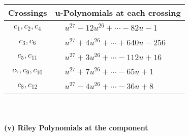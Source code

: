 \documentclass[1p]{elsarticle_modified}
\theoremstyle{definition}
\begin{document}
\begin{tabular}{m{50pt}|m{274pt}}
Crossings & \hspace{64pt}u-Polynomials at each crossing \\
\hline $$\begin{aligned}c_{1},c_{2},c_{4}\end{aligned}$$&$\begin{aligned}
&u^{27}-12 u^{26}+\cdots-82 u-1
\end{aligned}$\\
\hline $$\begin{aligned}c_{3},c_{6}\end{aligned}$$&$\begin{aligned}
&u^{27}+4 u^{26}+\cdots+640 u-256
\end{aligned}$\\
\hline $$\begin{aligned}c_{5},c_{11}\end{aligned}$$&$\begin{aligned}
&u^{27}+3 u^{26}+\cdots-112 u+16
\end{aligned}$\\
\hline $$\begin{aligned}c_{7},c_{9},c_{10}\end{aligned}$$&$\begin{aligned}
&u^{27}+7 u^{26}+\cdots-65 u+1
\end{aligned}$\\
\hline $$\begin{aligned}c_{8},c_{12}\end{aligned}$$&$\begin{aligned}
&u^{27}-4 u^{26}+\cdots-36 u+8
\end{aligned}$\\
\hline
\end{tabular}\\~\\
\newpage\renewcommand{\arraystretch}{1}
\flushleft \textbf{(v) Riley Polynomials at the component}\newline \\
\end{document}
